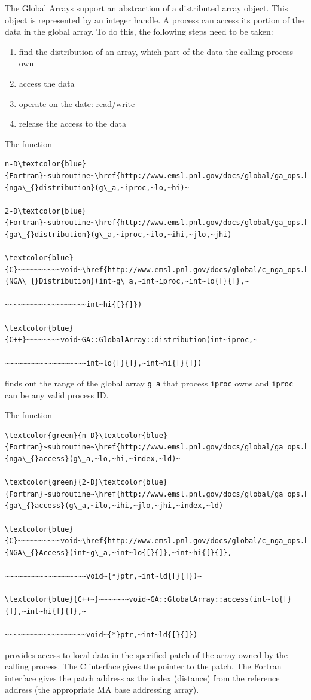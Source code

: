 The Global Arrays support an abstraction of a distributed array object.
This object is represented by an integer handle. A process can access
its portion of the data in the global array. To do this, the following
steps need to be taken:
\begin{enumerate}
\item find the distribution of an array, which part of the data the calling
process own 
\item access the data 
\item operate on the date: read/write 
\item release the access to the data
\end{enumerate}
The function
\begin{verbatim}
n-D\textcolor{blue}{Fortran}~subroutine~\href{http://www.emsl.pnl.gov/docs/global/ga_ops.html\#ga_distribute}{nga\_{}distribution}(g\_a,~iproc,~lo,~hi)~

2-D\textcolor{blue}{Fortran}~subroutine~\href{http://www.emsl.pnl.gov/docs/global/ga_ops.html\#ga_distribute}{ga\_{}distribution}(g\_a,~iproc,~ilo,~ihi,~jlo,~jhi)

\textcolor{blue}{C}~~~~~~~~~~void~\href{http://www.emsl.pnl.gov/docs/global/c_nga_ops.html\#ga_distribute}{NGA\_{}Distribution}(int~g\_a,~int~iproc,~int~lo{[}{]},~

~~~~~~~~~~~~~~~~~~~int~hi{[}{]})

\textcolor{blue}{C++}~~~~~~~~void~GA::GlobalArray::distribution(int~iproc,~

~~~~~~~~~~~~~~~~~~~int~lo{[}{]},~int~hi{[}{]})
\end{verbatim}
finds out the range of the global array \texttt{g\_a} that process
\texttt{iproc} owns and \texttt{iproc} can be any valid process ID.

The function
\begin{verbatim}
\textcolor{green}{n-D}\textcolor{blue}{Fortran}~subroutine~\href{http://www.emsl.pnl.gov/docs/global/ga_ops.html\#ga_access}{nga\_{}access}(g\_a,~lo,~hi,~index,~ld)~

\textcolor{green}{2-D}\textcolor{blue}{Fortran}~subroutine~\href{http://www.emsl.pnl.gov/docs/global/ga_ops.html\#ga_access}{ga\_{}access}(g\_a,~ilo,~ihi,~jlo,~jhi,~index,~ld)

\textcolor{blue}{C}~~~~~~~~~~void~\href{http://www.emsl.pnl.gov/docs/global/c_nga_ops.html\#ga_access}{NGA\_{}Access}(int~g\_a,~int~lo{[}{]},~int~hi{[}{]},

~~~~~~~~~~~~~~~~~~~void~{*}ptr,~int~ld{[}{]})~

\textcolor{blue}{C++~}~~~~~~~void~GA::GlobalArray::access(int~lo{[}{]},~int~hi{[}{]},~

~~~~~~~~~~~~~~~~~~~void~{*}ptr,~int~ld{[}{]})
\end{verbatim}
provides access to local data in the specified patch of the array
owned by the calling process. The C interface gives the pointer to
the patch. The Fortran interface gives the patch address as the index
(distance) from the reference address (the appropriate MA base addressing
array).

